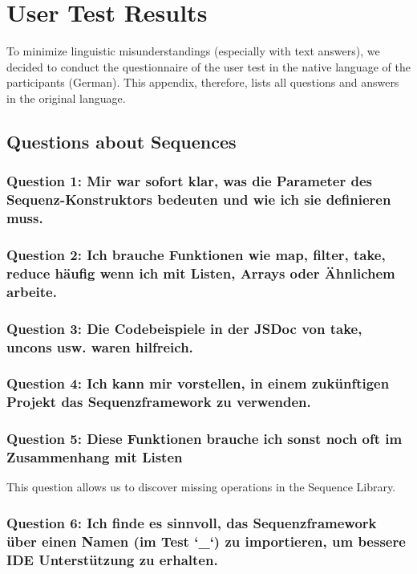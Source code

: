 \chapter{User Test Results}
\label{chap:app_user_test_results}
To minimize linguistic misunderstandings (especially with text answers), we
decided to conduct the questionnaire of the user test in the native language of
the participants (German). This appendix, therefore, lists all questions and
answers in the original language.
\section{Questions about Sequences} %
\label{sec:Questions about Sequences}
\subsection{Question 1: Mir war sofort klar, was die Parameter des Sequenz-Konstruktors bedeuten und wie ich sie definieren muss.}
\label{sub:ut_q1}

\subsection{Question 2: Ich brauche Funktionen wie map, filter, take, reduce häufig wenn ich mit Listen, Arrays oder Ähnlichem arbeite.}
\label{sub:ut_q2}

\subsection{Question 3: Die Codebeispiele in der JSDoc von take, uncons usw. waren hilfreich. }
\label{sub:ut_q3}

\subsection{Question 4: Ich kann mir vorstellen, in einem zukünftigen Projekt das Sequenzframework zu verwenden.}
\label{sub:ut_q4}

\subsection{Question 5: Diese Funktionen brauche ich sonst noch oft im Zusammenhang mit Listen}
This question allows us to discover missing operations in the Sequence Library.
\label{sub:ut_q5}
\subsection{Question 6: Ich finde es sinnvoll, das Sequenzframework über einen Namen (im Test `\_`) zu importieren, um bessere IDE Unterstützung zu erhalten.}
\label{sub:ut_q6}
